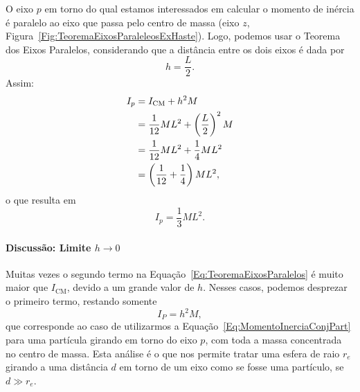 O eixo $p$ em torno do qual estamos interessados em calcular o momento de inércia é paralelo ao eixo que passa pelo centro de massa (eixo $z$, Figura~\ref{Fig:TeoremaEixosParaleleosExHaste}). Logo, podemos usar o Teorema dos Eixos Paralelos, considerando que a distância entre os dois eixos é dada por
\begin{equation}
    h = \frac{L}{2}.
\end{equation}
%
Assim:
\begin{align}
    I_p &= I_{\rm{CM}} + h^2 M \\
    &= \frac{1}{12} ML^2 + \left(\frac{L}{2}\right)^2 M \\
    &= \frac{1}{12} ML^2 + \frac{1}{4} ML^2 \\
    &= \left(\frac{1}{12} + \frac{1}{4}\right) ML^2,
\end{align}
%
o que resulta em 
\begin{equation}
    I_p = \frac{1}{3} ML^2.
\end{equation}

\paragraph{Discussão: Limite $h \to 0$}

Muitas vezes o segundo termo na Equação~\eqref{Eq:TeoremaEixosParalelos} é muito maior que $I_{\textrm{CM}}$, devido a um grande valor de $h$. Nesses casos, podemos desprezar o primeiro termo, restando somente
\begin{equation}
  I_P = h^2 M,
\end{equation}
%
que corresponde ao caso de utilizarmos a Equação~\eqref{Eq:MomentoInerciaConjPart} para uma partícula girando em torno do eixo $p$, com toda a massa concentrada no centro de massa. Esta análise é o que nos permite tratar uma esfera de raio $r_e$ girando a uma distância $d$ em torno de um eixo como se fosse uma partículo, se $d \gg r_e$.

